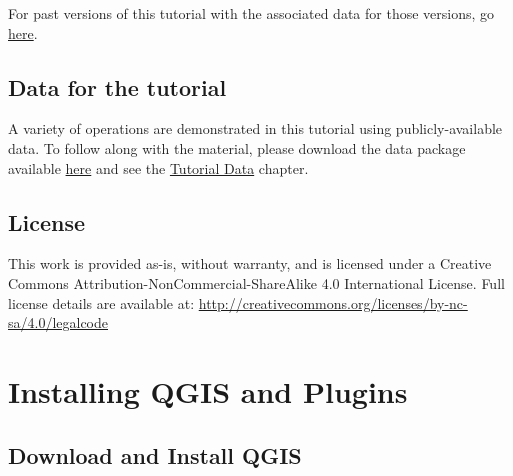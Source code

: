\documentclass[
  letterpaper,
  DIV=11,
  numbers=noendperiod]{scrreprt}
\begin{document}
For past versions of this tutorial with the associated data for those
versions, go \href{}{here}.

\hypertarget{data-for-the-tutorial}{%
\section*{Data for the tutorial}\label{data-for-the-tutorial}}


A variety of operations are demonstrated in this tutorial using
publicly-available data. To follow along with the material, please
download the data package available \href{}{here} and see the
\protect\hyperlink{tutorial-data}{Tutorial Data} chapter.

\hypertarget{license}{%
\section*{License}\label{license}}


This work is provided as-is, without warranty, and is licensed under a
Creative Commons Attribution-NonCommercial-ShareAlike 4.0 International
License. Full license details are available at:
\url{http://creativecommons.org/licenses/by-nc-sa/4.0/legalcode}


\hypertarget{installing-qgis-and-plugins}{%
\chapter{Installing QGIS and
Plugins}\label{installing-qgis-and-plugins}}

\hypertarget{download-and-install-qgis}{%
\section{Download and Install QGIS}\label{download-and-install-qgis}}
\end{document}
